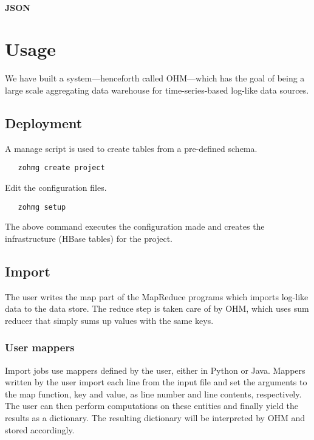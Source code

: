 \documentclass[a4paper,10pt]{book}
\begin{document}
\subsubsection{JSON}


\chapter{Usage}

We have built a system---henceforth called OHM---which has the goal of being
a large scale aggregating data warehouse for time-series-based log-like
data sources.



\section{Deployment}

A manage script is used to create tables from a pre-defined schema.

\begin{verbatim}
   zohmg create project
\end{verbatim}

\noindent Edit the configuration files.

\begin{verbatim}
   zohmg setup
\end{verbatim}

\noindent The above command executes the configuration made and creates the
infrastructure (HBase tables) for the project.


\section{Import}

The user writes the map part of the MapReduce programs which imports
log-like data to the data store. The reduce step is taken care of by OHM,
which uses sum reducer that simply sums up values with the same keys.


\subsection{User mappers}

Import jobs use mappers defined by the user, either in Python or Java.
Mappers written by the user import each line from the input file and set
the arguments to the map function, key and value, as line number and line
contents, respectively. The user can then perform computations on these
entities and finally yield the results as a dictionary. The resulting
dictionary will be interpreted by OHM and stored accordingly.
\end{document}
